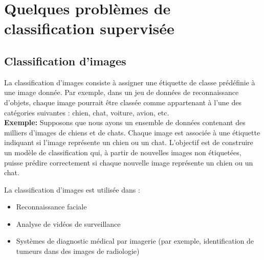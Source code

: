 \documentclass[12pt,a4paper,openay]{book}
\numberwithin{equation}{chapter}
\begin{document}
	  
	\section{Quelques probl\`emes de classification supervis\'ee}
	\subsection{Classification d'images}
	La classification d'images consiste \`a assigner une \'etiquette de classe pr\'ed\'efinie \`a une image donn\'ee. Par exemple, dans un jeu de donn\'ees de reconnaissance d'objets, chaque image pourrait \^etre class\'ee comme appartenant \`a l'une des cat\'egories suivantes : chien, chat, voiture, avion, etc.\\
	\textbf{Exemple:} Supposons que nous ayons un ensemble de donn\'ees contenant des milliers d'images de chiens et de chats. Chaque image est associ\'ee \`a une \'etiquette indiquant si l'image repr\'esente un chien ou un chat. L'objectif est de construire un mod\`ele de classification qui, \`a partir de nouvelles images non \'etiquet\'ees, puisse pr\'edire correctement si chaque nouvelle image repr\'esente un chien ou un chat.
	
	La classification d'images est utilis\'ee dans :
	\begin{itemize}
	 	\item[$\bullet$] Reconnaissance faciale
		\item[$\bullet$] Analyse de vid\'eos de surveillance
		\item[$\bullet$] Syst\`emes de diagnostic m\'edical par imagerie (par exemple, identification de tumeurs dans des images de radiologie)
	\end{itemize}
	
\end{document}
